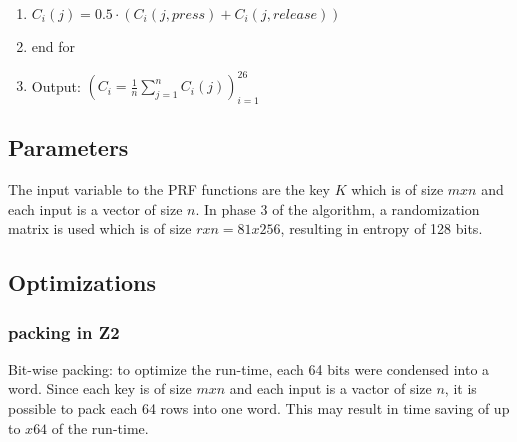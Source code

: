 \begin{algorithm}
\begin{enumerate}
		\item \hspace{5mm} $\displaystyle C_i(j) = 0.5 \cdot (C_i(j,press)+C_i(j,release))$
		
		\item end for
		
		
		\item  Output: $\displaystyle\left( C_i = \frac{1}{n} \sum_{j = 1}^n C_i(j) \right)_{i=1}^{26}$
		
	\end{enumerate}
	
	
\end{algorithm}

\fi

\subsection{Parameters}
The input variable to the PRF functions are the key $K$ which is of size $m x n$ and each input is a vector of size $n$. In phase 3 of the algorithm, a randomization matrix is used which is of size $r x n = 81 x 256$, resulting in entropy of 128 bits.

\subsection{Optimizations}

\subsubsection{packing in Z2}

Bit-wise packing: to optimize the run-time, each 64 bits were condensed into a word. Since each key is of size $m x n$ and each input is a vactor of size $n$, it is possible to pack each 64 rows into one word. This may result in time saving of up to $x64$ of the run-time.



